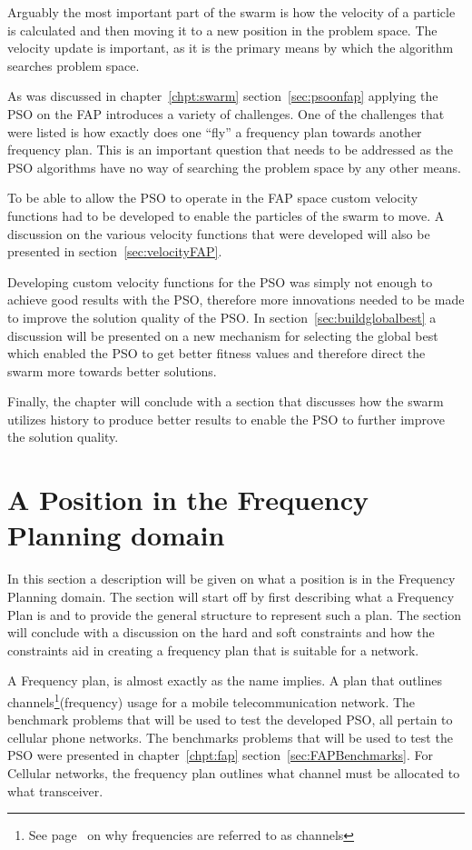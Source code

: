 Arguably the most important part of the swarm is how the velocity of a particle is calculated and then moving it to a new position in the problem space. The velocity update is important, as it is the primary means by which the algorithm searches problem space.

As was discussed in chapter~\ref{chpt:swarm} section~\ref{sec:psoonfap} applying the PSO on the FAP introduces a variety of challenges. One of the challenges that were listed is how exactly does one ``fly'' a frequency plan towards another frequency plan. This is an important question that needs to be addressed as the PSO algorithms have no way of searching the problem space by any other means.

To be able to allow the PSO to operate in the FAP space custom velocity functions had to be developed to enable the particles of the swarm to move. A discussion on the various velocity functions that were developed will also be presented in section~\ref{sec:velocityFAP}. 

Developing custom velocity functions for the PSO was simply not enough to achieve good results with the PSO, therefore more innovations needed to be made to improve the solution quality of the PSO. In section~\ref{sec:buildglobalbest} a discussion will be presented on a new mechanism for selecting the global best which enabled the PSO to get better fitness values and therefore direct the swarm more towards better solutions. 

Finally, the chapter will conclude with a section that discusses how the swarm utilizes history to produce better results to enable the PSO to further improve the solution quality.
\section{A Position in the Frequency Planning domain}
In this section a description will be given on what a position is in the Frequency Planning domain. The section will start off by first describing what a Frequency Plan is and to provide the general structure to represent such a plan. The section will conclude with a discussion on the hard and soft constraints and how the constraints aid in creating a frequency plan that is suitable for a network.

A Frequency plan, is almost exactly as the name implies. A plan that outlines channels\footnote{See page~\pageref{def:channel} on why frequencies are referred to as channels}(frequency) usage for a mobile telecommunication network. The benchmark problems that will be used to test the developed PSO, all pertain to cellular phone networks. The benchmarks problems that will be used to test the PSO were presented in chapter~\ref{chpt:fap} section~\ref{sec:FAPBenchmarks}. For Cellular networks, the frequency plan outlines what channel must be allocated to what transceiver.


